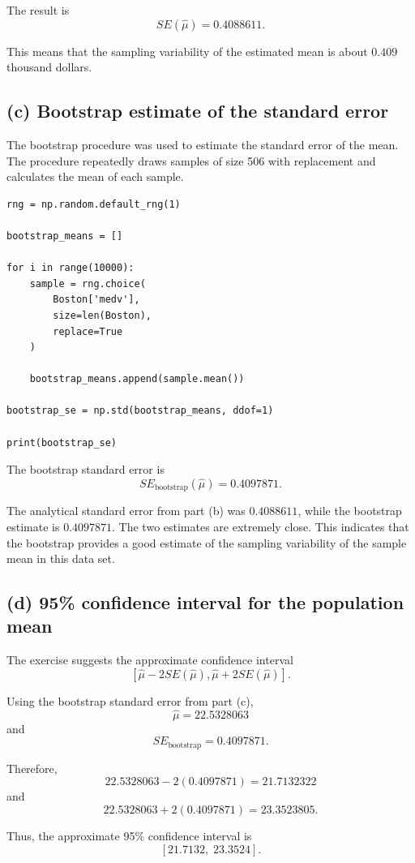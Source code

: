 \documentclass[12pt,a4paper]{article}
\begin{document}
The result is
\[
\boxed{SE(\hat{\mu})=0.4088611}.
\]

This means that the sampling variability of the estimated mean is about
$0.409$ thousand dollars.

\subsection*{(c) Bootstrap estimate of the standard error}

The bootstrap procedure was used to estimate the standard error of the
mean. The procedure repeatedly draws samples of size 506 with
replacement and calculates the mean of each sample.

\begin{lstlisting}
rng = np.random.default_rng(1)

bootstrap_means = []

for i in range(10000):
    sample = rng.choice(
        Boston['medv'],
        size=len(Boston),
        replace=True
    )

    bootstrap_means.append(sample.mean())

bootstrap_se = np.std(bootstrap_means, ddof=1)

print(bootstrap_se)
\end{lstlisting}

The bootstrap standard error is
\[
\boxed{SE_{\text{bootstrap}}(\hat{\mu})=0.4097871}.
\]

The analytical standard error from part (b) was $0.4088611$, while the
bootstrap estimate is $0.4097871$. The two estimates are extremely close.
This indicates that the bootstrap provides a good estimate of the
sampling variability of the sample mean in this data set.

\subsection*{(d) 95\% confidence interval for the population mean}

The exercise suggests the approximate confidence interval
\[
\left[
\hat{\mu}-2SE(\hat{\mu}),
\hat{\mu}+2SE(\hat{\mu})
\right].
\]

Using the bootstrap standard error from part (c),
\[
\hat{\mu}=22.5328063
\]
and
\[
SE_{\text{bootstrap}}=0.4097871.
\]

Therefore,
\[
22.5328063-2(0.4097871)=21.7132322
\]
and
\[
22.5328063+2(0.4097871)=23.3523805.
\]

Thus, the approximate 95\% confidence interval is
\[
\boxed{[21.7132,\;23.3524]}.
\]
\end{document}
